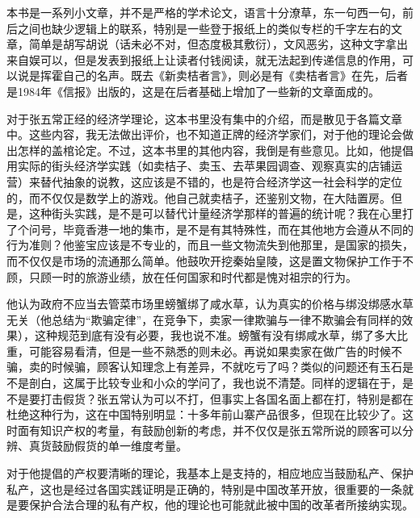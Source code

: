 本书是一系列小文章，并不是严格的学术论文，语言十分潦草，东一句西一句，前后之间也缺少逻辑上的联系，特别是一些登于报纸上的类似专栏的千字左右的文章，简单是胡写胡说（话未必不对，但态度极其敷衍），文风恶劣，这种文字拿出来自娱可以，但是发表到报纸上让读者付钱阅读，就无法起到传递信息的作用，可以说是挥霍自己的名声。既去《新卖桔者言》，则必是有《卖桔者言》在先，后者是1984年《信报》出版的，这是在后者基础上增加了一些新的文章面成的。

对于张五常正经的经济学理论，这本书里没有集中的介绍，而是散见于各篇文章中。这些内容，我无法做出评价，也不知道正牌的经济学家们，对于他的理论会做出怎样的盖棺论定。不过，这本书里的其他内容，我倒是有些意见。比如，他提倡用实际的街头经济学实践（如卖桔子、卖玉、去苹果园调查、观察真实的店铺运营）来替代抽象的说教，这应该是不错的，也是符合经济学这一社会科学的定位的，而不仅仅是数学上的游戏。他自己就卖桔子，还鉴别文物，在大陆置房。但是，这种街头实践，是不是可以替代计量经济学那样的普遍的统计呢？我在心里打了个问号，毕竟香港一地的集市，是不是有其特殊性，而在其他地方会遵从不同的行为准则？他鉴宝应该是不专业的，而且一些文物流失到他那里，是国家的损失，而不仅仅是市场的流通那么简单。他鼓吹开挖秦始皇陵，这是置文物保护工作于不顾，只顾一时的旅游业绩，放在任何国家和时代都是愧对祖宗的行为。

他认为政府不应当去管菜市场里螃蟹绑了咸水草，认为真实的价格与绑没绑感水草无关（他总结为“欺骗定律”，在竞争下，卖家一律欺骗与一律不欺骗会有同样的效果），这种规范到底有没有必要，我也说不准。螃蟹有没有绑咸水草，绑了多大比重，可能容易看清，但是一些不熟悉的则未必。再说如果卖家在做广告的时候不骗，卖的时候骗，顾客认知理念上有差异，不就吃亏了吗？类似的问题还有玉石是不是剖白，这属于比较专业和小众的学问了，我也说不清楚。同样的逻辑在于，是不是要打击假货？张五常认为可以不打，但事实上各国名面上都在打，特别是都在杜绝这种行为，这在中国特别明显：十多年前山寨产品很多，但现在比较少了。这时面有知识产权的考量，有鼓励创新的考虑，并不仅仅是张五常所说的顾客可以分辨、真货鼓励假货的单一维度考量。

对于他提倡的产权要清晰的理论，我基本上是支持的，相应地应当鼓励私产、保护私产，这也是经过各国实践证明是正确的，特别是中国改革开放，很重要的一条就是要保护合法合理的私有产权，他的理论也可能就此被中国的改革者所接纳实现。

